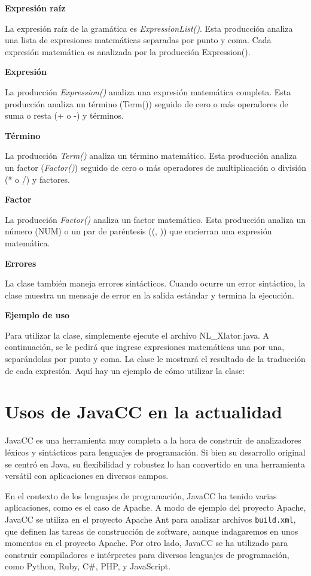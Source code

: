 \textbf{Expresión raíz}

La expresión raíz de la gramática es \textit{ExpressionList()}. Esta producción analiza una lista de expresiones matemáticas separadas por punto y coma. Cada expresión matemática es analizada por la producción Expression().

\textbf{Expresión}

La producción \textit{Expression()} analiza una expresión matemática completa. Esta producción analiza un término (Term()) seguido de cero o más operadores de suma o resta (+ o -) y términos.

\textbf{Término}

La producción \textit{Term()} analiza un término matemático. Esta producción analiza un factor (\textit{Factor()}) seguido de cero o más operadores de multiplicación o división (* o /) y factores.

\textbf{Factor}

La producción \textit{Factor()} analiza un factor matemático. Esta producción analiza un número (NUM) o un par de paréntesis ((, )) que encierran una expresión matemática.

\textbf{Errores}

La clase también maneja errores sintácticos. Cuando ocurre un error sintáctico, la clase muestra un mensaje de error en la salida estándar y termina la ejecución.

\textbf{Ejemplo de uso}

Para utilizar la clase, simplemente ejecute el archivo NL\_Xlator.java. A continuación, se le pedirá que ingrese expresiones matemáticas una por una, separándolas por punto y coma. La clase le mostrará el resultado de la traducción de cada expresión.
Aquí hay un ejemplo de cómo utilizar la clase:

\section{Usos de JavaCC en la actualidad}

JavaCC es una herramienta muy completa a la hora de construir de analizadores léxicos y sintácticos para lenguajes de programación. Si bien su desarrollo original se centró en Java, su flexibilidad y robustez lo han convertido en una herramienta versátil con aplicaciones en diversos campos.

En el contexto de los lenguajes de programación, JavaCC ha tenido varias aplicaciones, como es el caso de Apache. A modo de ejemplo del proyecto Apache, JavaCC se utiliza en el proyecto Apache Ant para analizar archivos  \lstinline|build.xml|, que definen las tareas de construcción de software\cite{apache}, aunque indagaremos en unos momentos en el proyecto Apache. Por otro lado, JavaCC se ha utilizado para construir compiladores e intérpretes para diversos lenguajes de programación, como Python, Ruby, C\#, PHP, y JavaScript\cite{javaccc++preprocessor}.

